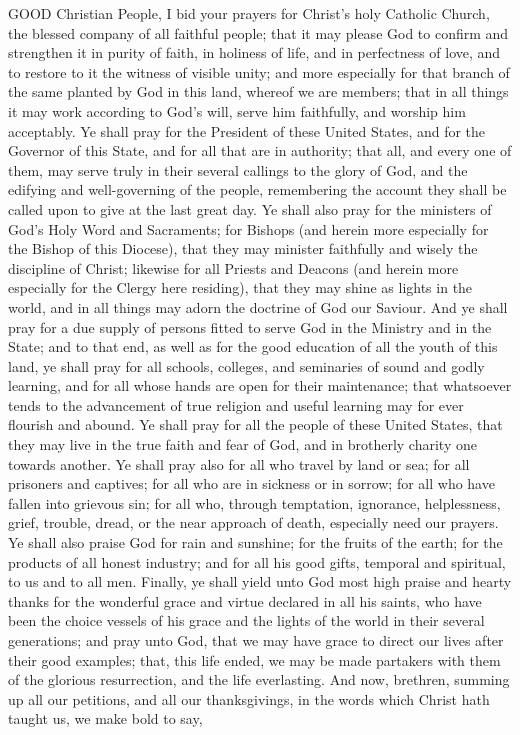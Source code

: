 GOOD Christian People, I bid your prayers for Christ’s holy Catholic Church, the blessed company of all faithful people; that it may please God to confirm and strengthen it in purity of faith, in holiness of life, and in perfectness of love, and to restore to it the witness of visible unity; and more especially for that branch of the same planted by God in this land, whereof we are members; that in all things it may work according to God’s will, serve him faithfully, and worship him acceptably.
    Ye shall pray for the President of these United States, and for the Governor of this State, and for all that are in authority; that all, and every one of them, may serve truly in their several callings to the glory of God, and the edifying and well-governing of the people, remembering the account they shall be called upon to give at the last great day.
    Ye shall also pray for the ministers of God’s Holy Word and Sacraments; for Bishops (and herein more especially for the Bishop of this Diocese), that they may minister faithfully and wisely the discipline of Christ; likewise for all Priests and Deacons (and herein more especially for the Clergy here residing), that they may shine as lights in the world, and in all things may adorn the doctrine of God our Saviour.
    And ye shall pray for a due supply of persons fitted to serve God in the Ministry and in the State; and to that end, as well as for the good education of all the youth of this land, ye shall pray for all schools, colleges, and seminaries of sound and godly learning, and for all whose hands are open for their maintenance; that whatsoever tends to the advancement of true religion and useful learning may for ever flourish and abound.
    Ye shall pray for all the people of these United States, that they may live in the true faith and fear of God, and in brotherly charity one towards another.
    Ye shall pray also for all who travel by land or sea; for all prisoners and captives; for all who are in sickness or in sorrow; for all who have fallen into grievous sin; for all who, through temptation, ignorance, helplessness, grief, trouble, dread, or the near approach of death, especially need our prayers.
    Ye shall also praise God for rain and sunshine; for the fruits of the earth; for the products of all honest industry; and for all his good gifts, temporal and spiritual, to us and to all men.
    Finally, ye shall yield unto God most high praise and hearty thanks for the wonderful grace and virtue declared in all his saints, who have been the choice vessels of his grace and the lights of the world in their several generations; and pray unto God, that we may have grace to direct our lives after their good examples; that, this life ended, we may be made partakers with them of the glorious resurrection, and the life everlasting.
    And now, brethren, summing up all our petitions, and all our thanksgivings, in the words which Christ hath taught us, we make bold to say,

